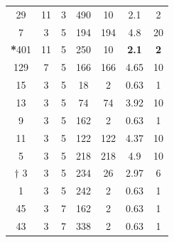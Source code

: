 \begin{table}
\begin{tabular}{cccc|ccc}
    29 & 11 & 3 & 490 & 10 & 2.1 & 2 \\
    7 & 3 & 5 & 194 & 194 & 4.8 & 20 \\
\hline
	\textbf{*}401 & 11 & 5 & 250 & 10 & \textbf{2.1} & \textbf{2} \\
\hline
 129 & 7 & 5 & 166 & 166 & 4.65 & 10 \\
      15 & 3 & 5 & 18 & 2 & 0.63 & 1 \\
    13 & 3 & 5 & 74 & 74 & 3.92 & 10 \\
      9 & 3 & 5 & 162 & 2 & 0.63 & 1 \\
  11 & 3 & 5 & 122 & 122 & 4.37 & 10 \\
    5 & 3 & 5 & 218 & 218 & 4.9 & 10 \\
	\hline
     $\dagger$ 3 & 3 & 5 & 234 & 26 & 2.97 & 6 \\
	\hline
      1 & 3 & 5 & 242 & 2 & 0.63 & 1 \\
     45 & 3 & 7 & 162 & 2 & 0.63 & 1 \\
     43 & 3 & 7 & 338 & 2 & 0.63 & 1 \\
 \hline
\end{tabular}
\label{tb:solutions}
\end{table}


